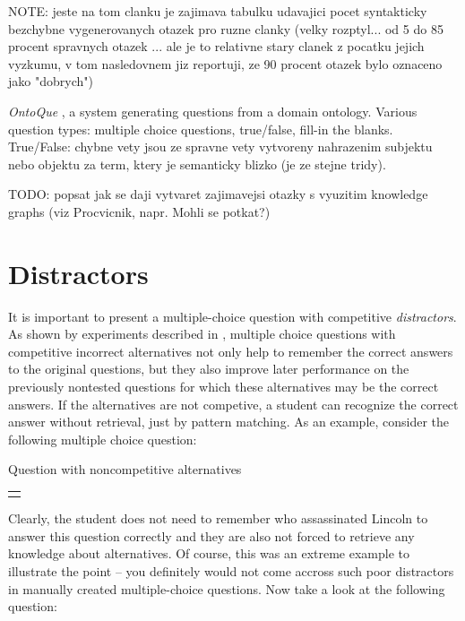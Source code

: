 \documentclass[a4paper, 12pt, twoside]{fithesis2}		%
\renewcommand{\_}{\leavevmode \kern0.0em\vbox{\hrule width0.4em}}
\newcounter{choice}
\renewcommand\thechoice{\Alph{choice}}
\newcommand\choicelabel{\thechoice.}
\newenvironment{choices}%
  {\vspace{0.8em}\list{\choicelabel}%
     {\usecounter{choice}\def\makelabel##1{\hss\llap{##1}}%
       \settowidth{\leftmargin}{W.\hskip\labelsep\hskip 0.01em}%
       \def\choice{%
         \item
       } %
       \labelwidth\leftmargin\advance\labelwidth-\labelsep
       \topsep=0pt
       \partopsep=0pt
     }%
  }%
  {\vspace{-0.7em}\endlist}
\newenvironment{question}
{
  \begin{center}
  \begin{tabular}{p{0.9\textwidth}}
  \vskip 0.05em
}
{
  \\
  \end{tabular}
  \end{center}
}
\newcommand{\sentenceGap}{\rule{1.5cm}{0.4pt}~}
\begin{document}
NOTE: jeste na tom clanku je zajimava tabulku udavajici pocet syntakticky bezchybne vygenerovanych otazek pro ruzne clanky (velky rozptyl... od 5 do 85 procent spravnych otazek ... ale je to relativne stary clanek z pocatku jejich vyzkumu, v tom nasledovnem jiz reportuji, ze 90 procent otazek bylo oznaceno jako "dobrych")

\textit{OntoQue} \cite{ontoque}, a system generating questions from a domain ontology.
Various question types: multiple choice questions, true/false, fill-in the blanks.
True/False: chybne vety jsou ze spravne vety vytvoreny nahrazenim subjektu nebo objektu za term, ktery je semanticky blizko (je ze stejne tridy).


TODO: popsat jak se daji vytvaret zajimavejsi otazky s vyuzitim knowledge graphs (viz Procvicnik, napr. Mohli se potkat?)


\section{Distractors}
\label{sec:distractors}

It is important to present a multiple-choice question with competitive \textit{distractors}.
As shown by experiments described in \cite{optimizing-multiple-choice}, multiple choice questions with competitive incorrect alternatives not only help to remember the correct answers to the original questions, but they also improve later performance on the previously nontested questions for which these alternatives may be the correct answers. If the alternatives are not competive, a student can recognize the correct answer without retrieval, just by pattern matching. As an example, consider the following multiple choice question:

\begin{exercise}
\caption{Question with noncompetitive alternatives}%
  \begin{question}
  Lincoln was assassinated by \sentenceGap , a Confederate sympathizer.
  \begin{choices}
    \choice Emancipation Proclamation
    \choice John Wilkes Booth
    \choice Illinois
    \choice Department of Agriculture
  \end{choices}
  \end{question}
\end{exercise}

Clearly, the student does not need to remember who assassinated Lincoln to answer this question correctly and they are also not forced to retrieve any knowledge about alternatives.
Of course, this was an extreme example to illustrate the point -- you definitely would not come accross such poor distractors in manually created multiple-choice questions.
Now take a look at the following question:
\end{document}
